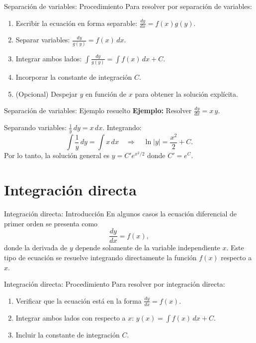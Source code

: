 \documentclass{beamer}
\begin{document}
\begin{frame}{Separación de variables: Procedimiento}
Para resolver por separación de variables:
\begin{enumerate}
  \item Escribir la ecuación en forma separable: $\displaystyle \frac{dy}{dx} = f(x) g(y)$.
  \item Separar variables: $\displaystyle \frac{dy}{g(y)} = f(x)\,dx$.
  \item Integrar ambos lados: $\displaystyle \int \frac{dy}{g(y)} = \int f(x)\,dx + C$.
  \item Incorporar la constante de integración $C$.
  \item (Opcional) Despejar $y$ en función de $x$ para obtener la solución explícita.
\end{enumerate}
\end{frame}

\begin{frame}{Separación de variables: Ejemplo resuelto}
\textbf{Ejemplo:} Resolver $\displaystyle\frac{dy}{dx} = x\,y$.

Separando variables: $\displaystyle \frac{1}{y}\,dy = x\,dx$. Integrando:
\[
\int \frac{1}{y}\,dy = \int x\,dx \quad\Longrightarrow\quad \ln|y| = \frac{x^2}{2} + C.
\]
Por lo tanto, la solución general es $y = C' e^{x^2/2}$ donde $C' = e^C$.
\end{frame}

\section*{Integración directa}
\begin{frame}{Integración directa: Introducción}
En algunos casos la ecuación diferencial de primer orden se presenta como
\[
\frac{dy}{dx} = f(x),
\]
donde la derivada de $y$ depende solamente de la variable independiente $x$. Este tipo de ecuación se resuelve integrando directamente la función $f(x)$ respecto a $x$.
\end{frame}

\begin{frame}{Integración directa: Procedimiento}
Para resolver por integración directa:
\begin{enumerate}
  \item Verificar que la ecuación está en la forma $\displaystyle \frac{dy}{dx} = f(x)$.
  \item Integrar ambos lados con respecto a $x$: $y(x) = \displaystyle \int f(x)\,dx + C$.
  \item Incluir la constante de integración $C$.
\end{enumerate}
\end{frame}
\end{document}
